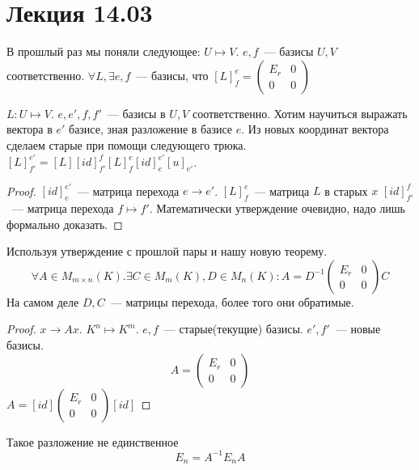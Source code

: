 \section{Лекция 14.03}
В прошлый раз мы поняли следующее:
$U\mapsto V$.
$e,f$~--- базисы $U, V$ соответственно.
$\forall L, \exists e,f$~--- базисы,
что $[L]_f^e=
\begin{pmatrix}
    E_r & 0\\
    0 & 0
\end{pmatrix}$

\begin{theorem}
    $L: U\mapsto V$. 
    $e, e', f, f'$~--- базисы в $U, V$ соответственно.
    Хотим научиться выражать вектора в $e'$ базисе, зная разложение
    в базисе $e$.
    Из новых координат вектора сделаем старые при помощи следующего трюка.
    $[L]^{e'}_{f'}=[L][id]_{f'}^{f}[L]_f^{e}[id]_e^{e'}[u]_{e'}$.
\end{theorem}
\begin{proof}
    $[id]_{e}^{e'}$~--- матрица перехода $e\rightarrow e'$.
    $[L]_f^e$~--- матрица $L$ в старых $x$
    $[id]_{f'}^f$~--- матрица перехода $f\mapsto f'$.
    Математически утверждение очевидно, надо лишь формально доказать.
\end{proof}
\begin{follow}
    Используя утверждение с прошлой пары и нашу новую теорему.
    $$\forall A\in M_{m\times n}(K).
    \exists C\in M_m(K), D\in M_n(K): A = D^{-1}
    \begin{pmatrix}
        E_r & 0\\
        0 & 0
    \end{pmatrix}C$$
    На самом деле $D, C$~--- матрицы перехода, более того они
    обратимые.
\end{follow}
\begin{proof}
    $x\rightarrow Ax$.
    $K^n\mapsto K^m$.
    $e, f$~--- старые(текущие) базисы.
    $e', f'$~--- новые базисы.
    $$A = \begin{pmatrix}
         E_r & 0\\
         0 & 0
        \end{pmatrix}
    $$
    $A = [id]\begin{pmatrix}
        E_r & 0\\
        0 & 0
    \end{pmatrix}[id]$
\end{proof}
\begin{remark}
    Такое разложение не единственное
    $$
    E_n = A^{-1}E_nA
    $$
\end{remark}
